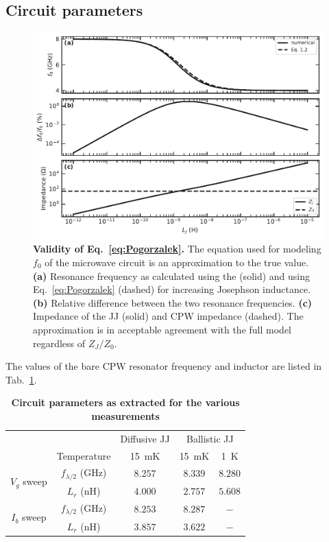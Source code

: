 \subsection{Circuit parameters}

\begin{figure}
	\centering
	\includegraphics[width=\linewidth]{chapter-gJJ-CPR/figs/SMFigure-validity}
	\caption{
		\textbf{Validity of Eq.~\ref{eq:Pogorzalek}.}
		The equation used for modeling $f_0$ of the microwave circuit is an approximation to the true value.
		\textbf{(a)} Resonance frequency as calculated using the  (solid) and using Eq.~\ref{eq:Pogorzalek} (dashed) for increasing Josephson inductance.
		\textbf{(b)} Relative difference between the two resonance frequencies.
		\textbf{(c)} Impedance of the JJ (solid) and CPW impedance (dashed).
		The approximation is in acceptable agreement with the full model regardless of $Z_J/Z_0$.
	}
	\label{fig:SMval}
\end{figure}

The values of the bare CPW resonator frequency and inductor are listed in Tab.~\ref{tab:frLr}.

\begin{table}[!h]
	\centering
	\caption{\textbf{Circuit parameters as extracted for the various measurements}}
	\begin{tabular}{ccccc}
		\hline\hline
		& & Diffusive JJ & \multicolumn{2}{c}{Ballistic JJ}  \\
		& Temperature & \SI{15}{\milli\kelvin} & \SI{15}{\milli\kelvin} & \SI{1}{\kelvin} \\
		\hline
		\multirow{ 2}{*}{$V_g$ sweep} & $f_{\lambda/2}$ (\si{\giga\hertz}) & $8.257$ & $8.339$ & $8.280$ \\
		& $L_r$ (\si{\nano\henry}) & $4.000$ & $2.757$ & $5.608$ \\
		\hline
		\multirow{ 2}{*}{$I_b$ sweep} & $f_{\lambda/2}$ (\si{\giga\hertz}) & $8.253$ & $8.287$ & $-$ \\
		& $L_r$ (\si{\nano\henry}) & $3.857$ & $3.622$ & $-$ \\
		\hline\hline
	\end{tabular}
	\label{tab:frLr}
\end{table}




